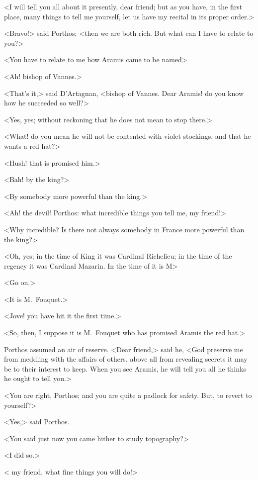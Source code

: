 <I will tell you all about it presently, dear friend; but as you have, in the first place, many things to tell me yourself, let us have my recital in its proper order.>

<Bravo!> said Porthos; <then we are both rich. But what can I have to relate to you?>

<You have to relate to me how Aramis came to be named\longdash>

<Ah! bishop of Vannes.>

<That's it,> said D'Artagnan, <bishop of Vannes. Dear Aramis! do you know how he succeeded so well?>

<Yes, yes; without reckoning that he does not mean to stop there.>

<What! do you mean he will not be contented with violet stockings, and that he wants a red hat?>

<Hush! that is promised him.>

<Bah! by the king?>

<By somebody more powerful than the king.>

<Ah! the devil! Porthos: what incredible things you tell me, my friend!>

<Why incredible? Is there not always somebody in France more powerful than the king?>

<Oh, yes; in the time of King  it was Cardinal Richelieu; in the time of the regency it was Cardinal Mazarin. In the time of  it is M\longdash>

<Go on.>

<It is M.~Fouquet.>

<Jove! you have hit it the first time.>

<So, then, I suppose it is M.~Fouquet who has promised Aramis the red hat.>

Porthos assumed an air of reserve. <Dear friend,> said he, <God preserve me from meddling with the affairs of others, above all from revealing secrets it may be to their interest to keep. When you see Aramis, he will tell you all he thinks he ought to tell you.>

<You are right, Porthos; and you are quite a padlock for safety. But, to revert to yourself?>

<Yes,> said Porthos.

<You said just now you came hither to study topography?>

<I did so.>

< my friend, what fine things you will do!>

